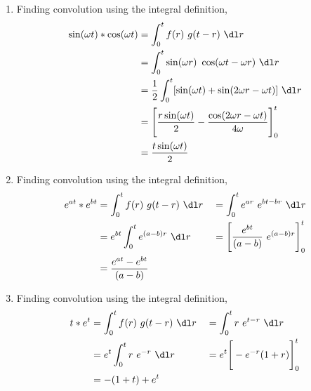 \begin{enumerate}
    \item Finding convolution using the integral definition,
          \begin{align}
              \sin(\omega t)
              * \cos(\omega t) & = \int_{0}^{t} f(r)\ g(t - r)\ \dl r      \\
                               & = \int_{0}^{t} \sin(\omega r)\
              \cos(\omega t - \omega r)\ \dl r                             \\
                               & = \frac{1}{2}\int_{0}^{t} [\sin(\omega t)
              + \sin(2\omega r - \omega t)]\ \dl r                         \\
                               & = \Bigg[ \frac{r\sin(\omega t)}{2}
              - \frac{\cos(2\omega r - \omega t)}{4\omega} \Bigg]_0^t      \\
                               & = \frac{t\sin(\omega t)}{2}
          \end{align}

    \item Finding convolution using the integral definition,
          \begin{align}
              e^{at} * e^{bt} & = \int_{0}^{t} f(r)\ g(t - r)\ \dl r                 &
                              & = \int_{0}^{t} e^{ar}\ e^{bt - br}\ \dl r              \\
                              & = e^{bt}\int_{0}^{t} e^{(a-b)r}\ \dl r               &
                              & = \Bigg[ \frac{e^{bt}}{(a-b)}\ e^{(a-b)r} \Bigg]_0^t   \\
                              & = \frac{e^{at} - e^{bt}}{(a-b)}
          \end{align}

    \item Finding convolution using the integral definition,
          \begin{align}
              t * e^{t} & = \int_{0}^{t} f(r)\ g(t - r)\ \dl r  &
                        & = \int_{0}^{t} r\ e^{t - r}\ \dl r      \\
                        & = e^{t}\int_{0}^{t} r\ e^{-r}\ \dl r  &
                        & = e^t \Bigg[ -e^{-r} (1+r) \Bigg]_0^t   \\
                        & = -(1+t) + e^t
          \end{align}


\end{enumerate}

